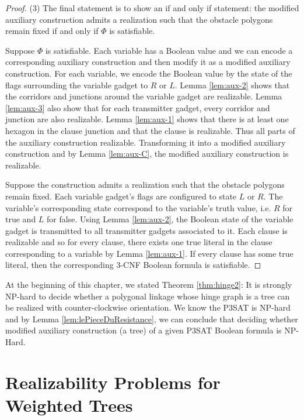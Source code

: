 \documentclass[10pt]{CSUNthesis}
\theoremstyle{plain}%
\theoremstyle{definition}
\theoremstyle{remark}
\begin{document}
\begin{proof}
\noindent (3) The final statement is to show an if and only if statement: the modified auxiliary construction admits a realization such that the obstacle polygons remain fixed if and only if $\Phi$ is satisfiable.

Suppose $\Phi$ is satisfiable.  
Each variable has a Boolean value and we can encode a corresponding auxiliary construction and then modify it as a modified auxiliary construction.
For each variable, we encode the Boolean value by the state of the flags surrounding the variable gadget to $R$ or $L$.  
Lemma \ref{lem:aux-2} shows that the corridors and junctions around the variable gadget are realizable.
Lemma \ref{lem:aux-3} also show that for each transmitter gadget, every corridor and junction are also realizable. 
Lemma \ref{lem:aux-1} shows that there is at least one hexagon in the clause junction and that the clause is realizable.
Thus all parts of the auxiliary construction realizable.  
Transforming it into a modified auxiliary construction and by Lemma \ref{lem:aux-C}, the modified auxiliary construction is realizable.

Suppose the construction admits a realization such that the obstacle polygons remain fixed.
Each variable gadget's flags are configured to state $L$ or $R$. 
The variable's corresponding state correspond to the variable's truth value, i.e. $R$ for true and $L$ for false.
Using Lemma \ref{lem:aux-2}, the Boolean state of the variable gadget is transmitted to all transmitter gadgets associated to it.
Each clause is realizable and so for every clause, there exists one true literal in the clause corresponding to a variable by Lemma \ref{lem:aux-1}. 
If every clause has some true literal, then the corresponding 3-CNF Boolean formula is satisfiable.
\end{proof}

At the beginning of this chapter, we stated Theorem \ref{thm:hinge2}: It is strongly NP-hard to decide whether a polygonal linkage whose hinge graph is a tree can be realized with counter-clockwise orientation.  
We know the P3SAT is NP-hard \cite{lichtenstein1982planar} and by Lemma \ref{lem:lePieceDuResistance}, we can conclude that deciding whether modified auxiliary construction (a tree) of a given P3SAT Boolean formula is NP-Hard.

\chapter{Realizability Problems for Weighted Trees}\label{chp:disk}
\end{document}
